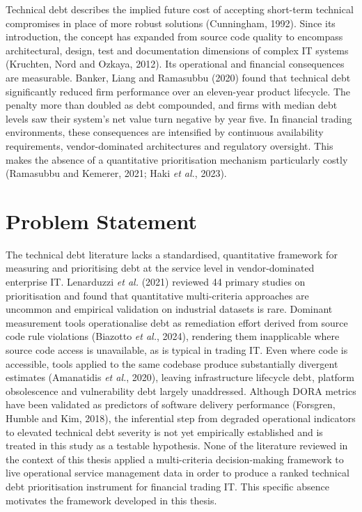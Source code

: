 \documentclass[
  12pt,
  letterpaper,
  12pt,
  oneside,
  english,
  onehalfspacing,
  headsepline]{MastersDoctoralThesis}
\begin{document}
Technical debt describes the implied future cost of accepting short-term
technical compromises in place of more robust solutions (Cunningham,
1992). Since its introduction, the concept has expanded from source code
quality to encompass architectural, design, test and documentation
dimensions of complex IT systems (Kruchten, Nord and Ozkaya, 2012). Its
operational and financial consequences are measurable. Banker, Liang and
Ramasubbu (2020) found that technical debt significantly reduced firm
performance over an eleven-year product lifecycle. The penalty more than
doubled as debt compounded, and firms with median debt levels saw their
system's net value turn negative by year five. In financial trading
environments, these consequences are intensified by continuous
availability requirements, vendor-dominated architectures and regulatory
oversight. This makes the absence of a quantitative prioritisation
mechanism particularly costly (Ramasubbu and Kemerer, 2021; Haki
\emph{et al.}, 2023).

\section{Problem Statement}\label{problem-statement}

The technical debt literature lacks a standardised, quantitative
framework for measuring and prioritising debt at the service level in
vendor-dominated enterprise IT. Lenarduzzi \emph{et al.} (2021) reviewed
44 primary studies on prioritisation and found that quantitative
multi-criteria approaches are uncommon and empirical validation on
industrial datasets is rare. Dominant measurement tools operationalise
debt as remediation effort derived from source code rule violations
(Biazotto \emph{et al.}, 2024), rendering them inapplicable where source
code access is unavailable, as is typical in trading IT. Even where code
is accessible, tools applied to the same codebase produce substantially
divergent estimates (Amanatidis \emph{et al.}, 2020), leaving
infrastructure lifecycle debt, platform obsolescence and vulnerability
debt largely unaddressed. Although DORA metrics have been validated as
predictors of software delivery performance (Forsgren, Humble and Kim,
2018), the inferential step from degraded operational indicators to
elevated technical debt severity is not yet empirically established and
is treated in this study as a testable hypothesis. None of the
literature reviewed in the context of this thesis applied a
multi-criteria decision-making framework to live operational service
management data in order to produce a ranked technical debt
prioritisation instrument for financial trading IT. This specific
absence motivates the framework developed in this thesis.
\end{document}
